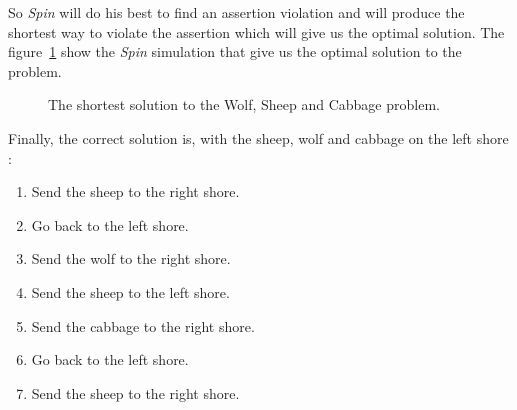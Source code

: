 \documentclass[a4paper,11pt]{report}
\begin{document}
So \textit{Spin} will do his best to find an assertion violation and will
produce the shortest way to violate the assertion which will give us the
optimal solution. The figure~\ref{fig:ex2_simulation} show the \textit{Spin}
simulation that give us the optimal solution to the problem.

\begin{figure}[ht]
  \centering
  \caption{\label{fig:ex2_simulation}The shortest solution to the Wolf, Sheep
    and Cabbage problem.}
\end{figure}

Finally, the correct solution is, with the sheep, wolf and cabbage on the left shore :
\begin{enumerate}
\item Send the sheep to the right shore.
\item Go back to the left shore.
\item Send the wolf to the right shore.
\item Send the sheep to the left shore.
\item Send the cabbage to the right shore.
\item Go back to the left shore.
\item Send the sheep to the right shore.
\end{enumerate}
\end{document}
